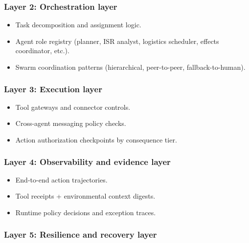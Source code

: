 \documentclass[
]{article}
\providecommand{\tightlist}{%
  \setlength{\itemsep}{0pt}\setlength{\parskip}{0pt}}
\begin{document}
\hypertarget{layer-2-orchestration-layer}{%
\subsubsection{Layer 2: Orchestration
layer}\label{layer-2-orchestration-layer}}

\begin{itemize}
\tightlist
\item
  Task decomposition and assignment logic.
\item
  Agent role registry (planner, ISR analyst, logistics scheduler,
  effects coordinator, etc.).
\item
  Swarm coordination patterns (hierarchical, peer-to-peer,
  fallback-to-human).
\end{itemize}

\hypertarget{layer-3-execution-layer}{%
\subsubsection{Layer 3: Execution layer}\label{layer-3-execution-layer}}

\begin{itemize}
\tightlist
\item
  Tool gateways and connector controls.
\item
  Cross-agent messaging policy checks.
\item
  Action authorization checkpoints by consequence tier.
\end{itemize}

\hypertarget{layer-4-observability-and-evidence-layer}{%
\subsubsection{Layer 4: Observability and evidence
layer}\label{layer-4-observability-and-evidence-layer}}

\begin{itemize}
\tightlist
\item
  End-to-end action trajectories.
\item
  Tool receipts + environmental context digests.
\item
  Runtime policy decisions and exception traces.
\end{itemize}

\hypertarget{layer-5-resilience-and-recovery-layer}{%
\subsubsection{Layer 5: Resilience and recovery
layer}\label{layer-5-resilience-and-recovery-layer}}
\end{document}
